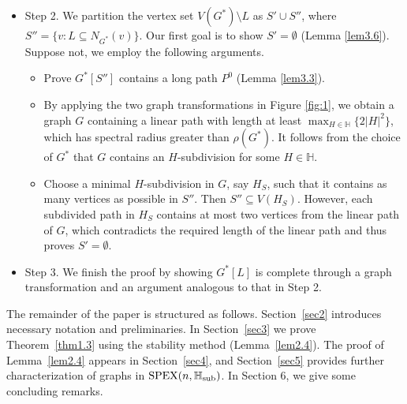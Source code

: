 \documentclass[11pt, a4paper]{article}
\theoremstyle{definition}
\newcommand{\<}{\subseteq}
\begin{document}
\begin{itemize}
\item Step 2. We partition the vertex set $V(G^*)\setminus L$ as $S'\cup S''$, where $S''=\{v:L\subseteq N_{G^*}(v)\}$. Our first goal is to show $S'=\emptyset$ (Lemma \ref{lem3.6}). Suppose not, we employ the following arguments. %
\begin{itemize}
    \item Prove $G^*[S'']$ contains a long path $P^0$ (Lemma \ref{lem3.3}). 
    \item By applying the two graph transformations in Figure \ref{fig:1}, we obtain  a graph $G$ containing a linear path with length at least $\max_{H\in \mathbb{H}} \{2|H|^2\}$, which has spectral radius greater than $\rho(G^*)$. It follows from the choice of $G^*$ that $G$ contains an $H$-subdivision for some $H\in \mathbb{H}$.%
    \item Choose a minimal $H$-subdivision in $G$, say $H_S$, such that it contains as many vertices as possible in $S''$. Then $S''\subseteq V(H_S)$. However,  each subdivided path in $H_S$ contains at most two vertices from the linear path of $G$, which contradicts the required length of the linear path  and thus proves $S' = \emptyset$. %
\end{itemize}
\item Step 3. We finish the proof by showing $G^*[L]$ is complete through a graph transformation and an argument analogous to that in Step 2. %
\end{itemize}
 
The remainder of the paper is structured as follows.
Section~\ref{sec2} introduces necessary notation and preliminaries. 
In Section~\ref{sec3} we prove Theorem~\ref{thm1.3} using the stability method (Lemma~\ref{lem2.4}). The proof of Lemma~\ref{lem2.4} appears in Section~\ref{sec4}, and  Section~\ref{sec5} provides further characterization of graphs in ${\rm SPEX}(n,\mathbb{H}_{\rm sub})$. In Section 6, we give some concluding remarks. 
\end{document}
